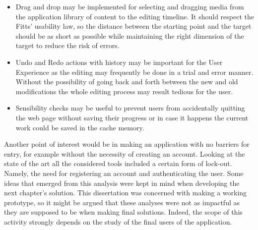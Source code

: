 \begin{itemize}
\item Drag and drop may be implemented for selecting and dragging media from the application library of content to the editing timeline. It should respect the Fitts' usability law, so the distance between the starting point and the target should be as short as possible while maintaining the right dimension of the target to reduce the risk of errors.
\item Undo and Redo actions with history may be important for the User Experience as the editing may frequently be done in a trial and error manner. Without the possibility of going back and forth between the new and old modifications the whole editing process may result tedious for the user.
\item Sensibility checks may be useful to prevent users from accidentally quitting the web page without saving their progress or in case it happens the current work could be saved in the cache memory.
\end{itemize}

Another point of interest would be in making an application with no barriers for entry, for example without the necessity of creating an account. Looking at the state of the art all the considered tools included a certain form of lock-out. Namely, the need for registering an account and authenticating the user.
Some ideas that emerged from this analysis were kept in mind when developing the next chapter’s solution. This dissertation was concerned with making a working prototype, so it might be argued that these analyses were not as impactful as they are supposed to be when making final solutions. Indeed, the scope of this activity strongly depends on the study of the final users of the application.